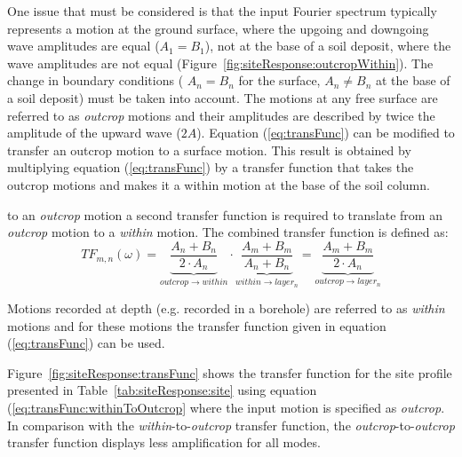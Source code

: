 \documentclass[12pt,oneside]{book}
\begin{document}
One issue that must be considered is that the input Fourier spectrum typically represents a motion
at the ground surface, where the upgoing and downgoing wave amplitudes are equal ($A_1=B_1$), not at
the base of a soil deposit, where the wave amplitudes are not equal
(Figure~\ref{fig:siteResponse:outcropWithin}). The change in boundary conditions ( $A_n = B_n$ for
the surface, $A_n \ne B_n$ at the base of a soil deposit) must be taken into account.  The motions
at any free surface are referred to as \emph{outcrop} motions and their
amplitudes are described by twice the amplitude of the upward wave ($2A$).  Equation
(\ref{eq:transFunc}) can be modified to transfer an outcrop motion to a surface motion.  This result
is obtained by multiplying equation (\ref{eq:transFunc}) by a transfer function that takes the
outcrop motions and makes it a within motion at the base of the soil column.

to an \emph{outcrop} motion a second transfer function is required to translate
from an \emph{outcrop} motion to a \emph{within} motion.  The combined transfer function is defined
as:
\begin{equation}
    TF_{m,n}(\omega) = \underbrace{\frac{A_n + B_n}{2\cdot A_n}}_{outcrop \to within} \cdot
    \underbrace{\frac{A_m + B_m}{A_n + B_n}}_{within \to layer_n} = \underbrace{\frac{A_m + B_m}{ 2
    \cdot A_n }}_{outcrop \to layer_n}
    \label{eq:transFunc:withinToOutcrop}
\end{equation}

Motions recorded at depth (e.g. recorded in a borehole) are referred to as
\emph{within} motions and for these motions the transfer function given in
equation (\ref{eq:transFunc}) can be used.  

Figure~\ref{fig:siteResponse:transFunc} shows the transfer function for the site profile presented
in Table~\ref{tab:siteResponse:site} using equation (\ref{eq:transFunc:withinToOutcrop} where the
input motion is specified as \emph{outcrop}. In comparison with the \emph{within}-to-\emph{outcrop}
transfer function, the \emph{outcrop}-to-\emph{outcrop} transfer function displays less
amplification for all modes.
\end{document}
